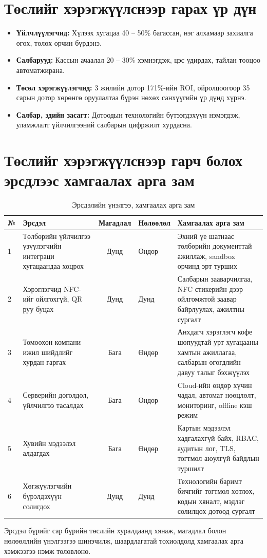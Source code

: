 \section{Төслийг хэрэгжүүлснээр гарах үр дүн}

\begin{itemize}
  \item \textbf{Үйлчлүүлэгчид:} Хүлээх хугацаа 40 -- 50\% багассан,
        нэг алхамаар захиалга өгөх, төлөх орчин бүрдэнэ.
  \item \textbf{Салбарууд:} Кассын ачаалал 20 -- 30\% хэмнэгдэж,
        цэс удирдах, тайлан тооцоо автоматжирана.
  \item \textbf{Төсөл хэрэгжүүлэгчид:} 3 жилийн дотор 171\%-ийн ROI,
        ойролцоогоор 35 сарын дотор хөрөнгө оруулалтаа бүрэн нөхөх
        санхүүгийн үр дүнд хүрнэ.
  \item \textbf{Салбар, эдийн засагт:} Дотоодын технологийн бүтээгдэхүүн
        нэмэгдэж, уламжлалт үйлчилгээний салбарын цифржилт хурдасна.
\end{itemize}

\section{Төслийг хэрэгжүүлснээр гарч болох эрсдлээс хамгаалах арга зам}

\begin{table}[h]
  \centering
  \caption{Эрсдэлийн үнэлгээ, хамгаалах арга зам}
  \label{tab:ch7-ersdel}
  \small
  \begin{tabular}{@{}p{0.8cm}p{3.6cm}cp{2.4cm}p{5.2cm}@{}}
    \toprule
    \textbf{№} & \textbf{Эрсдэл} & \textbf{Магадлал} & \textbf{Нөлөөлөл} &
    \textbf{Хамгаалах арга зам} \\ \midrule
    1 & Төлбөрийн үйлчилгээ үзүүлэгчийн интеграци хугацаандаа
        хоцрох & Дунд & Өндөр & Эхний үе шатнаас төлбөрийн
        документтай ажиллаж, sandbox орчинд эрт турших \\
    2 & Хэрэглэгчид NFC-ийг ойлгохгүй, QR руу буцах & Дунд & Дунд &
        Салбарын зааварчилгаа, NFC стикерийн дээр ойлгомжтой заавар
        байрлуулах, ажилтны сургалт \\
    3 & Томоохон компани ижил шийдлийг хурдан гаргах & Бага & Өндөр &
        Анхдагч хэрэглэгч кофе шопуудтай урт хугацааны хамтын
        ажиллагаа, салбарын өгөгдлийн давуу талыг бэхжүүлэх \\
    4 & Серверийн доголдол, үйлчилгээ тасалдах & Бага & Өндөр &
        Cloud-ийн өндөр хүчин чадал, автомат нөөцлөлт, мониторинг,
        offline кэш режим \\
    5 & Хувийн мэдээлэл алдагдах & Бага & Өндөр & Картын мэдээлэл
        хадгалахгүй байх, RBAC, аудитын лог, TLS, тогтмол аюулгүй
        байдлын туршилт \\
    6 & Хөгжүүлэгчийн бүрэлдэхүүн солигдох & Дунд & Дунд &
        Технологийн баримт бичгийг тогтмол хөтлөх, кодын хяналт,
        мэдлэг солилцох дотоод сургалт \\
    \bottomrule
  \end{tabular}
\end{table}

\noindent Эрсдэл бүрийг сар бүрийн төслийн хуралдаанд хянаж,
магадлал болон нөлөөллийн үнэлгээгээ шинэчилж, шаардлагатай
тохиолдолд хамгаалах арга хэмжээгээ нэмж төлөвлөнө.
